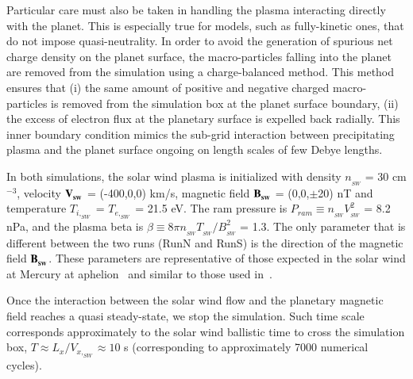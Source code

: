 \documentclass{aa}
\begin{document}
Particular care must also be taken in handling the plasma interacting directly with the planet. This is especially true for models, such as fully-kinetic ones, that do not impose quasi-neutrality. In order to avoid the generation of spurious net charge density on the planet surface, the macro-particles falling into the planet are removed from the simulation using a charge-balanced method.
This method ensures that (i) the same amount of positive and negative charged macro-particles is removed from the simulation box at the planet surface boundary, (ii) the excess of electron flux at the planetary surface is expelled back radially.
This inner boundary condition mimics the {sub-grid} interaction between precipitating plasma and the planet surface ongoing on length scales {of few Debye lengths}.

In both simulations, the solar wind plasma is initialized with density $n_{_{SW}}$ = 30 cm$^{-3}$, velocity $\bf{V_{_{SW}}}$ = (-400,0,0) km/s, magnetic field $\bf{B_{_{SW}}}$ = (0,0,$\pm$20) nT and temperature $T_{i,_{SW}}$ = $T_{e,_{SW}}$ = 21.5 eV. The ram pressure is $P_{ram} \equiv n_{_{SW}}V^2_{_{SW}}$ = 8.2 nPa, and the plasma beta is $\beta \equiv 8\pi n_{_{SW}}T_{_{SW}}/B^2_{_{SW}}$ = 1.3.
The only parameter that is different between the two runs (RunN and RunS) is the direction of the magnetic field $\bf{B_{_{SW}}}$. These parameters are representative of those expected in the  solar wind at Mercury at aphelion~\citep{James2017,Sarantos2007} and similar to those used in~\citet{Aizawa2021}.

Once the interaction between the solar wind flow and the planetary magnetic field reaches a quasi steady-state, we stop the simulation. Such time scale corresponds approximately to the solar wind ballistic time to cross the simulation box, $T\approx L_x/V_{x,_{SW}}\approx 10$ s (corresponding to approximately 7000 numerical cycles). 
\end{document}
